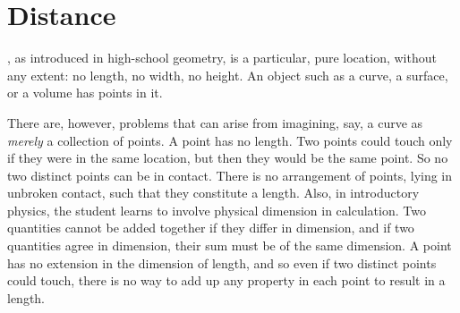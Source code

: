 \documentclass[nobib]{tufte-book}
\begin{document}


\mainmatter

\chapter{Distance}
\label{ch:distance}

, as introduced in high-school geometry, is a particular,
pure location, without any extent: no length, no width, no height.  An object
such as a curve, a surface, or a volume has points in it.

There are, however, problems that can arise from imagining, say, a curve as
\emph{merely} a collection of points.  A point has no length.  Two points could
touch only if they were in the same location, but then they would be the same
point.  So no two distinct points can be in contact.  There is no arrangement
of points, lying in unbroken contact, such that they constitute a length.
Also, in introductory physics, the student learns to involve physical dimension
in calculation.  Two quantities cannot be added together if they differ in
dimension, and if two quantities agree in dimension, their sum must be of the
same dimension.
A point has no extension in the dimension of length, and so even if two
distinct points could touch, there is no way to add up any property in each
point to result in a length.
\end{document}
